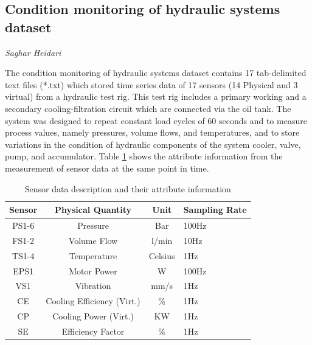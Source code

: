 \subsection{Condition monitoring of hydraulic systems dataset}
\vspace*{-5mm}
\hfill{\normalsize\emph{Saghar Heidari}}

The condition monitoring of hydraulic systems dataset \cite{CMOHS} contains 17 tab-delimited text files (*.txt) which stored time series data of 17 sensors (14 Physical and 3 virtual)  from a hydraulic test rig. This test rig includes a primary working and a secondary cooling-filtration circuit which are connected via the oil tank. The system was designed to repeat constant load cycles of 60 seconds and to measure process values, namely pressures, volume flows, and temperatures, and to store variations in the condition of hydraulic components of the system cooler, valve, pump, and accumulator. Table \ref{tab:Description_table1} shows the attribute information from the measurement of sensor data at the same point in time.


\begin{table}[ht]
 \centering
\begin{tabular}{|c|c|c|l|}
\hline
Sensor & Physical Quantity          & Unit    & Sampling Rate \\ \hline
PS1-6  & Pressure                   & Bar     & 100Hz         \\ \hline
FS1-2  & Volume Flow                & l/min   & 10Hz          \\ \hline
TS1-4  & Temperature                & Celsius & 1Hz           \\ \hline
EPS1   & Motor Power                & W       & 100Hz         \\ \hline
VS1    & Vibration                  & mm/s    & 1Hz           \\ \hline
CE     & Cooling Efficiency (Virt.) & \%      & 1Hz           \\ \hline
CP     & Cooling Power (Virt.)      & KW      & 1Hz           \\ \hline
SE     & Efficiency Factor          & \%      & 1Hz           \\ \hline
\end{tabular}
\vspace{0.3cm}
\captionsetup{justification=centering}
\caption{Sensor data description and their attribute information }
\label{tab:Description_table1}
\end{table}

